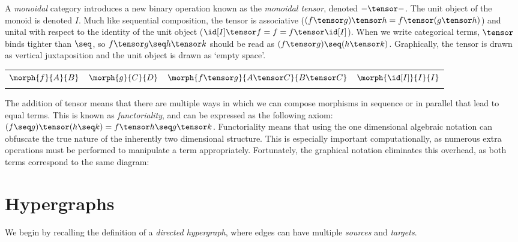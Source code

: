 \documentclass[10pt]{article}
\begin{document}
\noindent A \textit{monoidal} category \cite{joyal1991geometry} introduces a new binary operation known as the \textit{monoidal tensor}, denoted $- \tensor -$. 
The unit object of the monoid is denoted $I$.
Much like sequential composition, the tensor is associative ($(f \tensor g) \tensor h = f \tensor (g \tensor h)$) and unital with respect to the identity of the unit object ($\id[I] \tensor f = f = f \tensor \id[I]$).
When we write categorical terms, $\tensor$ binds tighter than $\seq$, so $f \tensor g \seq h \tensor k$ should be read as $(f \tensor g) \seq (h \tensor k)$.
Graphically, the tensor is drawn as vertical juxtaposition and the unit object is drawn as `empty space'.

\begin{floating}
    \begin{tabular}{cccc}
        \rule[-1em]{0pt}{0pt}$\morph{f}{A}{B}$ & $\morph{g}{C}{D}$ & $\morph{f \tensor g}{A \tensor C}{B \tensor C}$ & $\morph{\id[I]}{I}{I}$ \\
         &
         &
        \raisebox{-1.25em}{} &
        
    \end{tabular}
\end{floating}

\noindent The addition of tensor means that there are multiple ways in which we can compose morphisms in sequence or in parallel that lead to equal terms.
This is known as \emph{functoriality}, and can be expressed as the following axiom: $(f \seq g) \tensor (h \seq k) = f \tensor h \seq g \tensor k$.
Functoriality means that using the one dimensional algebraic notation can obfuscate the true nature of the inherently two dimensional structure.
This is especially important computationally, as numerous extra operations must be performed to manipulate a term appropriately.
Fortunately, the graphical notation eliminates this overhead, as both terms correspond to the same diagram:

\begin{floating}
    
\end{floating}

\section{Hypergraphs}

We begin by recalling the definition of a \emph{directed hypergraph}, where edges can have multiple \emph{sources} and \emph{targets}.
\end{document}
